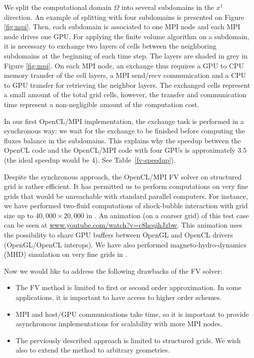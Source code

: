 \documentclass[preprint]{sig-alternate}
\begin{document}
We split the computational domain $\Omega$ into several subdomains in the $x^1$ direction. An example of splitting with four subdomains is presented on Figure \ref{fig:mpi}.
Then, each subdomain is associated to one MPI node and each MPI node drives one GPU. For applying the finite volume algorithm on a subdomain, it is necessary to exchange two layers of cells between the neighboring subdomains at the beginning of each time step. The layers are shaded in grey in Figure \ref{fig:mpi}. On each MPI node, an exchange thus requires a GPU to CPU memory transfer of the cell layers, a MPI send/recv communication and a CPU to GPU transfer for retrieving the neighbor layers. The exchanged cells represent a small amount of the total grid cells, however, the transfer and communication time represent a non-negligible amount of the computation cost.

In our first OpenCL/MPI implementation, the exchange task is performed in a synchronous way: we wait for the exchange to be finished before computing the fluxes balance in the subdomains.  This explains why the speedup between the OpenCL code and the OpenCL/MPI code with four GPUs is approximately 3.5 (the ideal speedup would be 4). See Table~\ref{fv-speedup}).

Despite the synchronous approach, the OpenCL/MPI FV solver on structured grid is rather efficient. It has permitted us to perform computations on very fine grids that would be unreachable with standard parallel computers. For instance, we have performed two-fluid computations of shock-bubble interaction with grid size  up to $40,000\times 20,000$  in \cite{helluy2014interpolated}. An animation (on a coarser grid) of this test case can be seen at \href{https://www.youtube.com/watch?v=c8hcqihJzbw}{\url{www.youtube.com/watch?v=c8hcqihJzbw}}. This animation uses the possibility to share GPU buffers between OpenGL and OpenCL drivers (OpenGL/OpenCL interops). We have also performed magneto-hydro-dynamics (MHD) simulation on very fine grids in \cite{massaro2014numerical}.

Now we would like to address the following drawbacks of the FV solver:
\begin{itemize}
\item The FV method is limited to first or second order approximation. In some applications, it is important to have access to higher order schemes.
\item MPI and host/GPU communications take time, so it is important to provide asynchronous implementations for scalability with more MPI nodes.
\item The previously described approach is limited to structured grids. We wish also to extend the method to arbitrary geometries.
\end{itemize}
\end{document}
